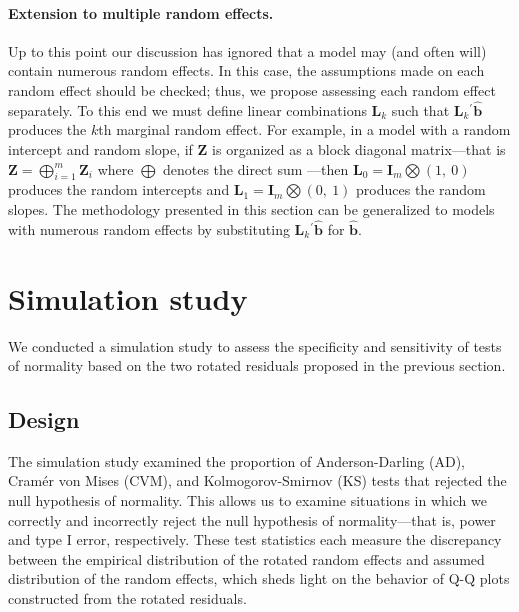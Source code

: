 \documentclass[12pt]{article} %
\newcommand{\trans}{\ensuremath{^\prime}}
\begin{document}
\paragraph{Extension to multiple random effects.}
Up to this point our discussion has ignored that a model may (and often will) contain numerous random effects. In this case, the assumptions made on each random effect should be checked; thus, we propose assessing each random effect separately. To this end we must define linear combinations $\bm{L}_k$ such that $\bm{L}_k\trans \widehat{\bm{b}}$ produces the $k$th marginal random effect. For example, in a model with a random intercept and random slope, if $\bm{Z}$ is organized as a block diagonal matrix---that is $\bm{Z} = \bigoplus_{i=1}^{m} \bm{Z}_{i}$ where $\bigoplus$ denotes the direct sum \citep[page 47]{Gentle:2007}---then $\bm{L}_0 = \bm{I}_{m} \bigotimes ( 1,\ 0)$ produces the random intercepts and $\bm{L}_1 = \bm{I}_{m} \bigotimes ( 0,\ 1)$ produces the random slopes. The methodology presented in this section can be generalized to models with numerous random effects by substituting $\bm{L}_k\trans \widehat{\bm{b}}$ for $\widehat{\bm{b}}$.


\section{Simulation study}\label{sec:simulation}

We conducted a simulation study to assess the specificity and sensitivity of tests of normality based on the two rotated residuals proposed in the previous section. 

\subsection{Design}\label{sec:sim-design}

The simulation study examined the proportion of Anderson-Darling (AD), Cram{\'e}r von Mises (CVM), and Kolmogorov-Smirnov (KS) tests that rejected the null hypothesis of normality. This allows us to examine situations in which we correctly and incorrectly reject the null hypothesis of normality---that is, power and type I error, respectively.  These test statistics each measure the discrepancy between the empirical distribution of the rotated random effects and assumed distribution of the random effects, which sheds light on the behavior of Q-Q plots constructed from the rotated residuals. 
\end{document}
